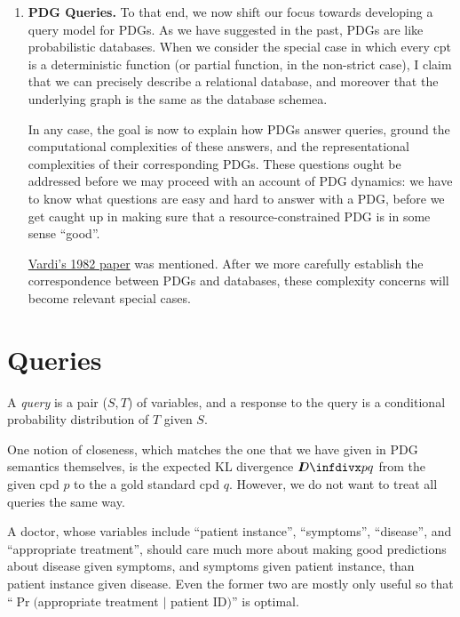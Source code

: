\documentclass{article}
\theoremstyle{plain}
\theoremstyle{definition}
\theoremstyle{remark}
\newcommand{\thickD}{I\mkern-8muD}
\newcommand{\kldiv}{\thickD\infdivx}
\begin{document}
\begin{enumerate}
		\item \textbf{PDG Queries.} To that end, we now shift our focus towards developing a query model for PDGs. As we have suggested in the past, PDGs are like probabilistic databases. When we consider the special case in which every cpt is a deterministic function (or partial function, in the non-strict case), I claim that we can precisely describe a relational database, and moreover that the underlying graph is the same as the database schemea.
		
		In any case, the goal is now to explain how PDGs answer queries, ground the computational complexities of these answers, and the representational complexities of their corresponding PDGs. These questions ought be addressed before we may proceed with an account of PDG dynamics: we have to know what questions are easy and hard to answer with a PDG, before we get caught up in making sure that a resource-constrained PDG is in some sense ``good''.
		
		\href{https://www.researchgate.net/publication/221590198_The_Complexity_of_Relational_Query_Languages_Extended_Abstract}{Vardi's 1982 paper} was mentioned. After we more carefully establish the correspondence between PDGs and databases, these complexity concerns will become relevant special cases.
		
		
	\end{enumerate}
	
	
	\section{Queries}
	
	\begin{defn}
		A \emph{query} is a pair ($S, T$) of variables, and a response to the query is a conditional probability distribution of $T$ given $S$. 
	\end{defn}
	
	One notion of closeness, which matches the one that we have given in PDG semantics themselves, is the expected KL divergence $\kldiv p q$ from the given cpd $p$ to the a gold standard cpd $q$. However, we do not want to treat all queries the same way.
	
	\medskip
	\begin{example}
		A doctor, whose variables include ``patient instance'', ``symptoms'', ``disease'', and  ``appropriate treatment'', should care much more about making good predictions about disease given symptoms, and symptoms given patient instance, than patient instance given disease. Even the former two are mostly only useful so that ``$\Pr($appropriate treatment $\mid$ patient ID$)$'' is optimal.
	\end{example}
	
\end{document}
